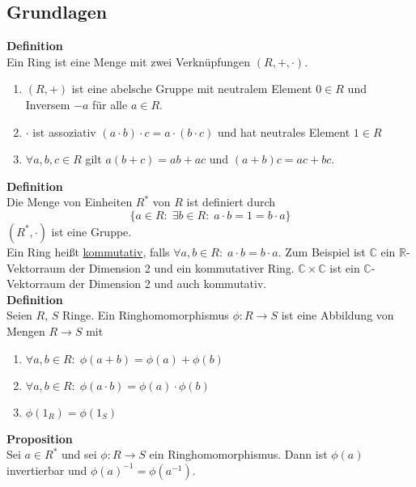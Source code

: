 \documentclass[a4paper, 12pt]{article}
\begin{document}
\subsection{Grundlagen}
\textbf{Definition}\\
Ein Ring ist eine Menge mit zwei Verknüpfungen $(R,+,\cdot)$. \begin{enumerate}
	\item $(R,+)$ ist eine abelsche Gruppe mit neutralem Element $0\in R$ und Inversem $-a$ für alle $a \in R$.
	\item $\cdot$ ist assoziativ $(a\cdot b) \cdot c = a \cdot (b\cdot c)$ und hat neutrales Element $1 \in R$
	\item $\forall a,b,c \in R$ gilt $a(b+c) = ab + ac$ und $(a+b)c = ac + bc$.
\end{enumerate}
\textbf{Definition}\\
Die Menge von Einheiten $R^*$ von $R$ ist definiert durch \[\{a \in R: \; \exists b \in R: \; a\cdot b = 1 = b\cdot a\}\]
$(R^*, \cdot)$ ist eine Gruppe.\\

Ein Ring heißt \underline{kommutativ}, falls $\forall a,b \in R: \; a\cdot b = b\cdot a$. Zum Beispiel ist $\mathbb{C}$ ein $\mathbb{R}$-Vektorraum der Dimension 2 und ein kommutativer Ring. $\mathbb{C} \times \mathbb{C}$ ist ein $\mathbb{C}$-Vektorraum der Dimension 2 und auch kommutativ.\\
\textbf{Definition}\\
Seien $R$, $S$ Ringe. Ein Ringhomomorphismus $\phi: R \to S$ ist eine Abbildung von Mengen $R \to S$ mit \begin{enumerate}
	\item $\forall a,b \in R: \; \phi(a+b) = \phi(a)+\phi(b)$
	\item $\forall a,b \in R: \; \phi(a\cdot b) = \phi(a) \cdot \phi(b)$
	\item $\phi(1_R) = \phi(1_S)$ 
\end{enumerate}
\textbf{Proposition}\\
Sei $a \in R^*$ und sei $\phi: R \to S$ ein Ringhomomorphismus. Dann ist $\phi(a)$ invertierbar und $\phi(a)^{-1} = \phi(a^{-1})$.\\
\end{document}
